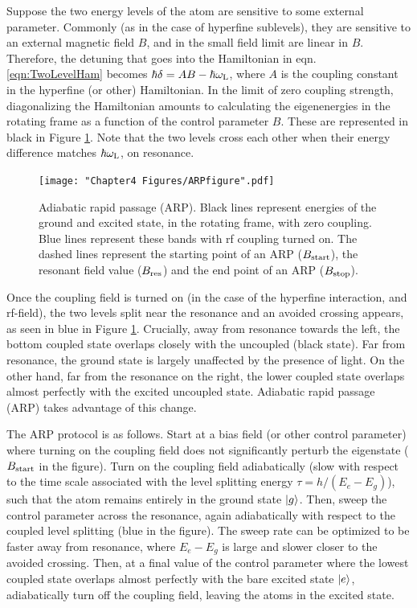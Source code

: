 Suppose the two energy levels of the atom are sensitive to some external parameter. Commonly (as in the case of hyperfine sublevels), they are sensitive to an external magnetic field $B$, and in the small field limit are linear in $B$. Therefore, the detuning that goes into the Hamiltonian in eqn. \ref{eqn:TwoLevelHam} becomes $\hbar\delta = AB - \hbar\omega_{\rm L}$, where $A$ is the coupling constant in the hyperfine (or other) Hamiltonian.   In the limit of zero coupling strength, diagonalizing the Hamiltonian amounts to calculating the eigenenergies in the rotating frame as a function of the control parameter $B$. These are represented in black in Figure \ref{fig:ARPfigure}. Note that the two levels cross each other when their energy difference matches $\hbar\omega_{\rm L}$, on resonance.
\begin{figure}
	\texttt{[image: "Chapter4 Figures/ARPfigure".pdf]}
\caption[Adiabatic rapid passage (ARP)]{Adiabatic rapid passage (ARP). Black lines represent energies of the ground and excited state, in the rotating frame, with zero coupling. Blue lines represent these bands with rf coupling turned on. The dashed lines represent the starting point of an ARP ($B_{\rm start}$), the resonant field value ($B_{\rm res}$) and the end point of an ARP ($B_{\rm stop}$).}
\label{fig:ARPfigure}
\end{figure}

Once the coupling field is turned on (in the case of the hyperfine interaction, and rf-field), the two levels split near the resonance and an avoided crossing appears, as seen in blue in Figure \ref{fig:ARPfigure}. Crucially, away from resonance towards the left, the bottom coupled state overlaps closely with the uncoupled (black state). Far from resonance, the ground state is largely unaffected by the presence of light. On the other hand, far from the resonance on the right, the lower coupled state overlaps almost perfectly with the excited uncoupled state. Adiabatic rapid passage (ARP) takes advantage of this change.

The ARP protocol is as follows. Start at a bias field (or other control parameter) where turning on the coupling field does not significantly perturb the eigenstate ($B_{\rm start}$ in the figure). Turn on the coupling field adiabatically (slow with respect to the time scale associated with the level splitting energy $\tau = h/(E_{e}-E_{g})$), such that the atom remains entirely in the ground state $\mathinner{|{g}\rangle}$. Then, sweep the control parameter across the resonance, again adiabatically with respect to the coupled level splitting (blue in the figure). The sweep rate can be optimized to be faster away from resonance, where $E_{e}-E_{g}$ is large and slower closer to the avoided crossing. Then, at a final value of the control parameter where the lowest coupled state overlaps almost perfectly with the bare excited state $\mathinner{|{e}\rangle}$, adiabatically turn off the coupling field, leaving the atoms in the excited state. 

